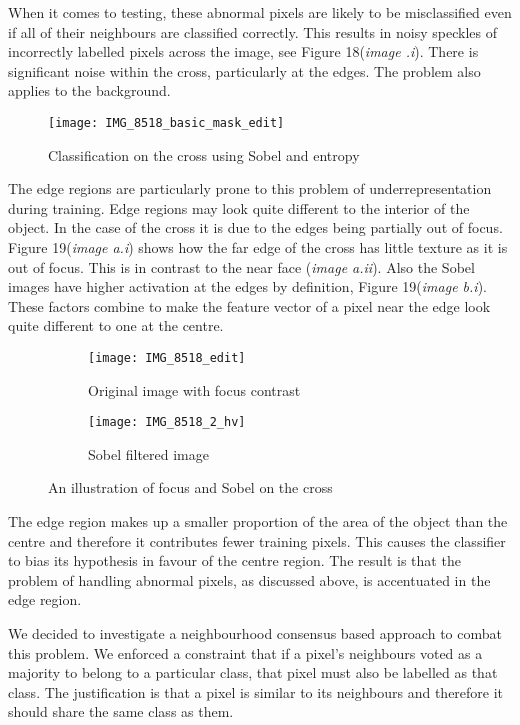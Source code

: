 \documentclass[12pt]{IIBproject}
\begin{document}
When it comes to testing, these abnormal pixels are likely to be misclassified even if all of their neighbours are classified correctly. This results in noisy speckles of incorrectly labelled pixels across the image, see Figure 18(\emph{image .i}). There is significant noise within the cross, particularly at the edges. The problem also applies to the background.
\begin{figure}[H]
  
  \centering
    \texttt{[image: IMG\_8518\_basic\_mask\_edit]}
    \caption{Classification on the cross using Sobel and entropy}
\end{figure}
The edge regions are particularly prone to this problem of underrepresentation during training. Edge regions may look quite different to the interior of the object. In the case of the cross it is due to the edges being partially out of focus. Figure 19(\emph{image a.i}) shows how the far edge of the cross has little texture as it is out of focus. This is in contrast to the near face (\emph{image a.ii}). Also the Sobel images have higher activation at the edges by definition, Figure 19(\emph{image b.i}). These factors combine to make the feature vector of a pixel near the edge look quite different to one at the centre.
\begin{figure}[H]
\centering
\begin{subfigure}{.45\textwidth}
  \centering
  \texttt{[image: IMG\_8518\_edit]}
  \caption{Original image with focus contrast}
  \label{fig:sub2}
\end{subfigure}
\begin{subfigure}{.45\textwidth}
  \centering
  \texttt{[image: IMG\_8518\_2\_hv]}
  \caption{Sobel filtered image}
  \label{fig:sub1}
\end{subfigure}%

\caption{An illustration of focus and Sobel on the cross}
\label{fig:test}
\end{figure}
 The edge region makes up a smaller proportion of the area of the object than the centre and therefore it contributes fewer training pixels. This causes the classifier to bias its hypothesis in favour of the centre region. The result is that the problem of handling abnormal pixels, as discussed above, is accentuated in the edge region. 
 
We decided to investigate a neighbourhood consensus based approach to combat this problem. We enforced a constraint that if a pixel's neighbours voted as a majority to belong to a particular class, that pixel must also be labelled as that class. The justification is that a pixel is similar to its neighbours and therefore it should share the same class as them. 
\end{document}
